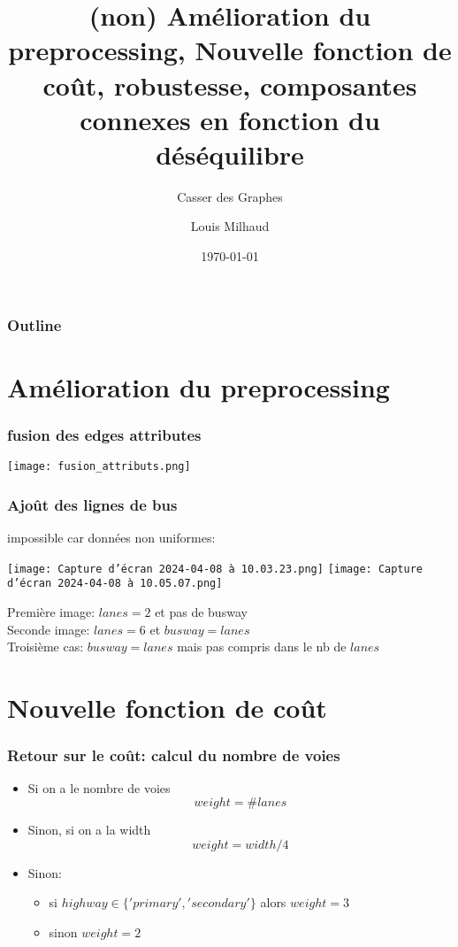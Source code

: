 \documentclass[aspectratio=169]{beamer}
\title{(non) Amélioration du preprocessing, Nouvelle fonction de coût, robustesse, composantes connexes en fonction du déséquilibre}
\subtitle{Casser des Graphes}
\author{Louis Milhaud}
\institute{Complex Networks - LIP6}
\date{\today}
\begin{document}
    \begin{frame}
        \titlepage
    \end{frame}

    \begin{frame}
        \frametitle{Outline}
        \tableofcontents
    \end{frame}

    \section{Amélioration du preprocessing}
    \begin{frame}
        \frametitle{fusion des edges attributes}
        \centering
        \texttt{[image: fusion\_attributs.png]}
    \end{frame}
    \begin{frame}
        \frametitle{Ajoût des lignes de bus}
        impossible car données non uniformes:\\
        \vspace{15pt}
        \begin{center}
            \texttt{[image: Capture d’écran 2024-04-08 à 10.03.23.png]}
            \texttt{[image: Capture d’écran 2024-04-08 à 10.05.07.png]}
        \end{center}
        Première image: $lanes = 2$ et pas de busway\\
        Seconde image: $lanes = 6$ et $busway = lanes$\\
        Troisième cas: $busway = lanes$ mais pas compris dans le nb de $lanes$
    \end{frame}
    \section{Nouvelle fonction de coût}
    \begin{frame}
        \frametitle{Retour sur le coût: calcul du nombre de voies}
        \begin{itemize}
            \item Si on a le nombre de voies
            $$weight = \#lanes$$
            \item Sinon, si on a la width
            $$weight = width \slash 4$$
            \item Sinon:
            \begin{itemize}
                \item si $highway \in \{'primary', 'secondary'\}$ alors $weight = 3$
                \item sinon  $weight = 2$
            \end{itemize}
        \end{itemize}
    \end{frame}
\end{document}
